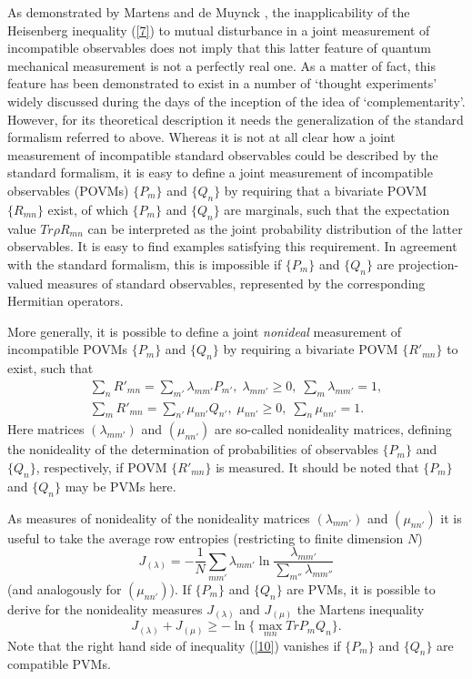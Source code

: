 \documentclass[12pt]{article}
\begin{document}
As demonstrated by Martens and de Muynck \cite{MadM90}, the
inapplicability of the Heisenberg inequality (\ref{7}) to mutual
disturbance in a joint measurement of incompatible observables
does not imply that this latter feature of quantum mechanical
measurement is not a perfectly real one. As a matter of fact, this
feature has been demonstrated to exist in a number of `thought
experiments' widely discussed during the days of the inception of
the idea of `complementarity'. However, for its theoretical
description it needs the generalization of the standard formalism
referred to above. Whereas it is not at all clear how a joint
measurement of incompatible standard observables could be
described by the standard formalism, it is easy to define a joint
measurement of incompatible observables (POVMs) $\{P_m\}$ and $\{
Q_n\}$ by requiring that a bivariate POVM $\{R_{mn}\}$ exist, of
which $\{P_m\}$ and $\{ Q_n\}$ are marginals, such that the
expectation value $Tr \rho R_{mn}$ can be interpreted as the joint
probability distribution of the latter observables. It is easy to
find examples satisfying this requirement. In agreement with the
standard formalism, this is impossible if $\{P_m\}$ and $\{ Q_n\}$
are projection-valued measures of standard observables,
represented by the corresponding Hermitian operators.

More generally, it is possible to define a joint {\em nonideal}
measurement of incompatible POVMs $\{P_m\}$ and $\{ Q_n\}$ by
requiring a bivariate POVM $\{R'_{mn}\}$ to exist, such that
\begin{equation}\label{8}
\begin{array}{l}
\sum_{n} R'_{mn} = \sum_{m'} \lambda_{mm'} P_{m'},\; \lambda_{mm'}
\geq 0,\; \sum_{m} \lambda_{mm'} = 1,\\
\sum_{m} R'_{mn} = \sum_{n'} \mu_{nn'} Q_{n'},\; \mu_{nn'} \geq
0,\; \sum_{n} \mu_{nn'} = 1.\end{array}
\end{equation}
Here matrices $(\lambda_{mm'})$ and $(\mu_{nn'})$ are so-called
nonideality matrices, defining the nonideality of the
determination of probabilities of observables $\{P_m\}$ and $\{
Q_n\}$, respectively, if POVM $\{R'_{mn}\}$ is measured. It should
be noted that $\{P_m\}$ and $\{ Q_n\}$ may be PVMs here.

As measures of nonideality of the nonideality matrices
$(\lambda_{mm'})$ and $(\mu_{nn'})$ it is useful to take the
average row entropies (restricting to finite dimension $N$)
\begin{equation}\label{9}
J_{(\lambda)} = - \frac{1}{N} \sum_{mm'} \lambda_{mm'} \ln
\frac{\lambda_{mm'}} {\sum_{m''} \lambda_{mm''}}
\end{equation}
(and analogously for $(\mu_{nn'})$). If $\{P_m\}$ and $\{ Q_n\}$
are PVMs, it is possible \cite{MadM90} to derive for the
nonideality measures $J_{(\lambda)}$ and $J_{(\mu)}$ the Martens
inequality
\begin{equation}\label{10}
  J_{(\lambda)} + J_{(\mu)} \geq -\ln \{\max_{mn} Tr P_m
Q_n\}.
\end{equation}
 Note that the right hand
side of inequality (\ref{10}) vanishes if $\{P_m\}$ and $\{ Q_n\}$
are compatible PVMs.
\end{document}
